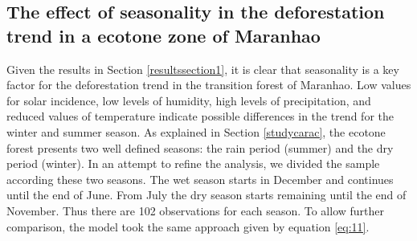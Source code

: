 


\subsection{The effect of seasonality in the deforestation trend in a ecotone zone of Maranhao} \label{resultssection2}

Given the results in Section \ref{resultssection1}, it is clear that seasonality is a key factor for the deforestation trend in the transition forest of Maranhao. Low values for solar incidence, low levels of humidity, high levels of precipitation, and reduced values of temperature indicate possible differences in the trend for the winter and summer season. As explained in Section \ref{studycarac}, the ecotone forest presents two well defined seasons: the rain period (summer) and the dry period (winter). In an attempt to refine the analysis, we divided the sample according these two seasons. The wet season starts in December and continues until the end of June. From July the dry season starts remaining until the end of November. Thus there are 102 observations for each season. To allow further comparison, the model took the same approach given by equation \ref{eq:11}. 

